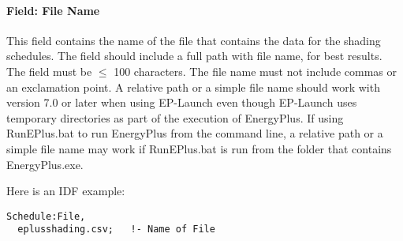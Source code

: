 \paragraph{Field: File Name}\label{schedulefileshading-field-file-name}

This field contains the name of the file that contains the data for the shading schedules. The field should include a full path with file name, for best results. The field must be \(\le\) 100 characters. The file name must not include commas or an exclamation point. A relative path or a simple file name should work with version 7.0 or later when using EP-Launch even though EP-Launch uses temporary directories as part of the execution of EnergyPlus. If using RunEPlus.bat to run EnergyPlus from the command line, a relative path or a simple file name may work if RunEPlus.bat is run from the folder that contains EnergyPlus.exe.

Here is an IDF example:

\begin{lstlisting}
Schedule:File,
  eplusshading.csv;   !- Name of File
\end{lstlisting}
